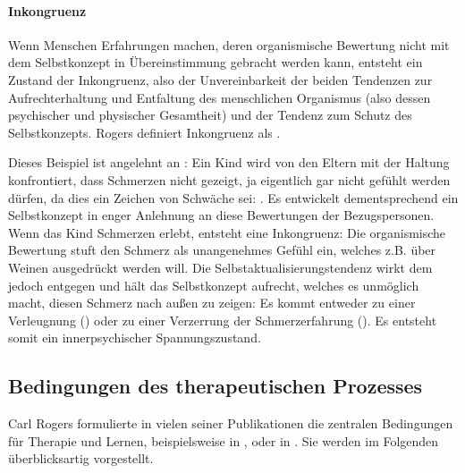 \documentclass[
  twoside,
  parskip=half-,
  paper=176mm:246mm,
  BCOR=14mm,
  DIV=14,
]{scrreprt}
\begin{document}
\paragraph{Inkongruenz} Wenn Menschen Erfahrungen machen, deren organismische Bewertung nicht mit dem Selbstkonzept in Übereinstimmung gebracht werden kann, entsteht ein Zustand der Inkongruenz, also der Unvereinbarkeit der beiden Tendenzen zur Aufrechterhaltung und Entfaltung des menschlichen Organismus (also dessen psychischer und physischer Gesamtheit) und der Tendenz zum Schutz des Selbstkonzepts. Rogers definiert Inkongruenz als  . 

\begin{beispiel}
  Dieses Beispiel ist angelehnt an \textcite[26]{weinberger}: Ein Kind wird von den Eltern mit der Haltung konfrontiert, dass Schmerzen nicht gezeigt, ja eigentlich gar nicht gefühlt werden dürfen, da dies ein Zeichen von Schwäche sei: . Es entwickelt dementsprechend ein Selbstkonzept in enger Anlehnung an diese Bewertungen der Bezugspersonen. Wenn das Kind Schmerzen erlebt, entsteht eine Inkongruenz: Die organismische Bewertung stuft den Schmerz als unangenehmes Gefühl ein, welches z.B. über Weinen ausgedrückt werden will. Die Selbstaktualisierungstendenz wirkt dem jedoch entgegen und hält das Selbstkonzept aufrecht, welches es unmöglich macht, diesen Schmerz nach außen zu zeigen:  Es kommt entweder zu einer Verleugnung () oder zu einer Verzerrung der Schmerzerfahrung (). Es entsteht somit ein innerpsychischer Spannungszustand.
\end{beispiel}

\subsection{Bedingungen des therapeutischen Prozesses}

Carl Rogers formulierte in vielen seiner Publikationen die zentralen Bedingungen für Therapie und Lernen, beispielsweise in ,  oder in . Sie werden im Folgenden überblicksartig vorgestellt. 
\end{document}
